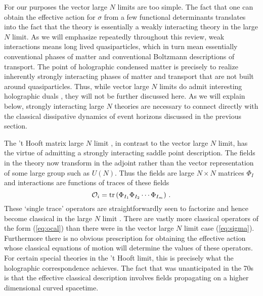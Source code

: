 \documentclass[10pt, oneside]{book}
\def\be{\begin{equation}}
\def\ee{\end{equation}}
\newcommand{\tr}{{\rm tr} }
\def\ocal{{\mathcal{O}}}
\begin{document}
\begin{doublespace}
For our purposes the vector large $N$ limits are too simple. The fact that one can obtain the effective action for $\sigma$ from a few functional determinants translates into the fact that the theory is essentially a weakly interacting theory in the large $N$ limit.  As we will emphasize repeatedly throughout this review, weak interactions means long lived quasiparticles, which in turn mean essentially conventional phases of matter and conventional Boltzmann descriptions of transport. The point of holographic condensed matter is precisely to realize inherently strongly interacting phases of matter and transport that are not built around quasiparticles. Thus, while vector large $N$ limits do admit interesting holographic duals \cite{Giombi:2012ms}, they will not be further discussed here. As we will explain below, strongly interacting large $N$ theories are necessary to connect directly with the classical dissipative dynamics of event horizons discussed in the previous section.

The 't Hooft matrix large $N$ limit \cite{'tHooft:1973jz}, in contrast to the vector large $N$ limit, has the virtue of admitting a strongly interacting saddle point description. The fields in the theory now transform in the adjoint rather than the vector representation of some large group such as $U(N)$. Thus the fields are large $N \times N$ matrices $\Phi_I$ and interactions are functions of traces of these fields
\be\label{eq:ocal}
\ocal_i = \tr \left(\Phi_{I_1} \Phi_{I_2} \cdots \Phi_{I_m} \right) \,.
\ee
These `single trace' operators are straightforwardly seen to factorize and hence become classical in the large $N$ limit \cite{Witten:1979pi, Coleman:1980nk}. There are vastly more classical operators of the form (\ref{eq:ocal}) than there were in the vector large $N$ limit case (\ref{eq:sigma}). Furthermore there is no obvious prescription for obtaining the effective action whose classical equations of motion will determine the values of these operators. For certain special theories in the 't Hooft limit, this is precisely what the holographic correspondence achieves. The fact that was unanticipated in the 70s is that the effective classical description involves fields propagating on a higher dimensional curved spacetime.


\end{doublespace}
\end{document}
